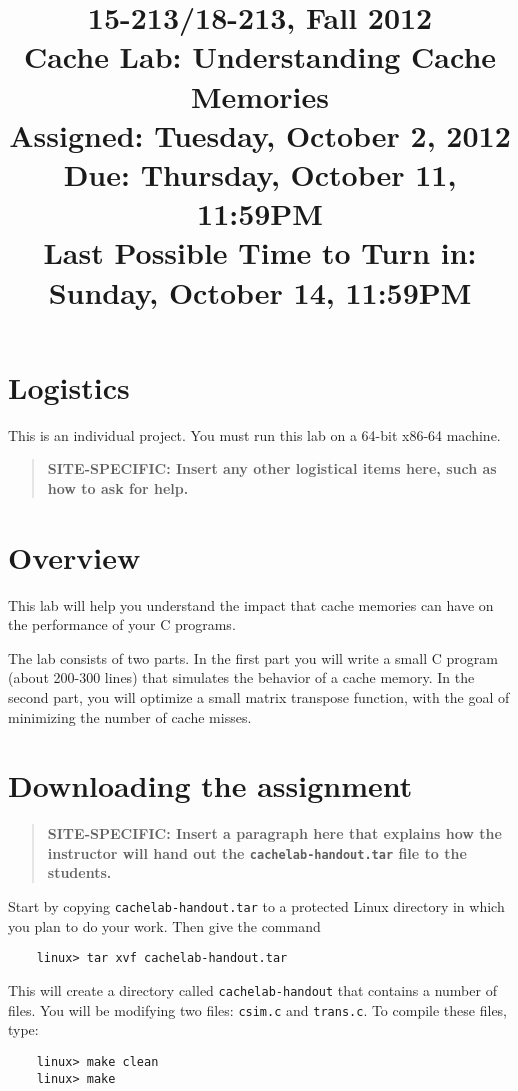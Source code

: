 \documentclass[11pt]{article}
\begin{document}
\title{15-213/18-213, Fall 2012\\
Cache Lab: Understanding Cache Memories\\
Assigned: Tuesday, October 2, 2012\\ 
Due: Thursday, October 11, 11:59PM\\
Last Possible Time to Turn in: Sunday, October 14, 11:59PM
}

\author{}
\date{}

\maketitle

\section{Logistics}
This is an individual project. You must run this lab on a 64-bit x86-64 machine. 

\begin{quote}
{\bf SITE-SPECIFIC: Insert any other logistical items here, such as how to ask for help.}
\end{quote}


\section{Overview}
This lab will help you understand the impact that cache memories can
have on the performance of your C programs.

The lab consists of two parts. In the first part you will write a
small C program (about 200-300 lines) that simulates the behavior of a
cache memory.  In the second part, you will optimize a small matrix
transpose function, with the goal of minimizing the number of cache
misses.

\section{Downloading the assignment}

\begin{quote}
{\bf SITE-SPECIFIC: Insert a paragraph here that explains how the
instructor will hand out the {\tt cachelab-handout.tar} file to the
students.}
\end{quote}

Start by copying {\tt cachelab-handout.tar} to a protected Linux directory
in which you plan to do your work.  Then give the command
\begin{verbatim}
    linux> tar xvf cachelab-handout.tar
\end{verbatim}
This will create a directory called {\tt cachelab-handout} that
contains a number of files.  You will be modifying two
files: {\tt csim.c} and {\tt trans.c}.  To compile these files, type:
\begin{verbatim}
    linux> make clean
    linux> make
\end{verbatim}
\end{document}
